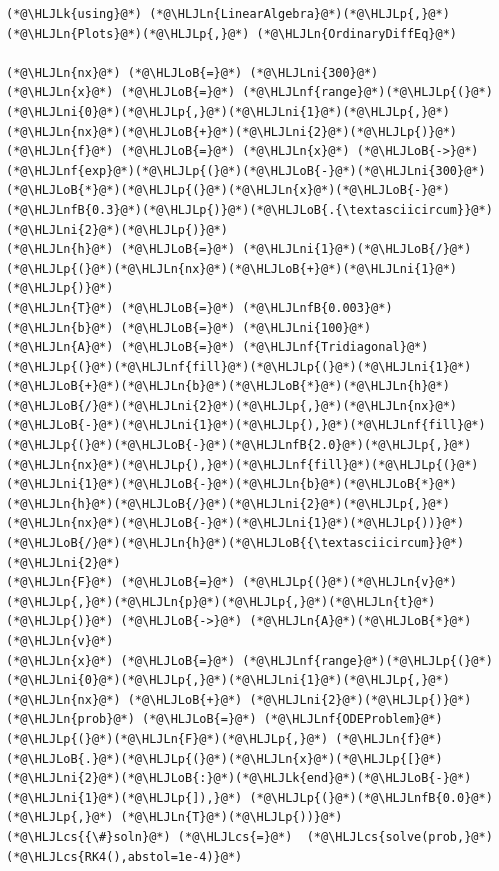 \documentclass[12pt,a4paper]{article}
\newcommand{\HLJLk}[1]{\textcolor[RGB]{148,91,176}{\textbf{#1}}}
\newcommand{\HLJLn}[1]{#1}
\newcommand{\HLJLnf}[1]{\textcolor[RGB]{66,102,213}{#1}}
\newcommand{\HLJLnfB}[1]{\textcolor[RGB]{59,151,46}{#1}}
\newcommand{\HLJLni}[1]{\textcolor[RGB]{59,151,46}{#1}}
\newcommand{\HLJLoB}[1]{\textcolor[RGB]{102,102,102}{\textbf{#1}}}
\newcommand{\HLJLp}[1]{#1}
\newcommand{\HLJLcs}[1]{\textcolor[RGB]{153,153,119}{\textit{#1}}}
\begin{document}
\begin{lstlisting}
(*@\HLJLk{using}@*) (*@\HLJLn{LinearAlgebra}@*)(*@\HLJLp{,}@*) (*@\HLJLn{Plots}@*)(*@\HLJLp{,}@*) (*@\HLJLn{OrdinaryDiffEq}@*)

(*@\HLJLn{nx}@*) (*@\HLJLoB{=}@*) (*@\HLJLni{300}@*)
(*@\HLJLn{x}@*) (*@\HLJLoB{=}@*) (*@\HLJLnf{range}@*)(*@\HLJLp{(}@*)(*@\HLJLni{0}@*)(*@\HLJLp{,}@*)(*@\HLJLni{1}@*)(*@\HLJLp{,}@*)(*@\HLJLn{nx}@*)(*@\HLJLoB{+}@*)(*@\HLJLni{2}@*)(*@\HLJLp{)}@*)
(*@\HLJLn{f}@*) (*@\HLJLoB{=}@*) (*@\HLJLn{x}@*) (*@\HLJLoB{->}@*) (*@\HLJLnf{exp}@*)(*@\HLJLp{(}@*)(*@\HLJLoB{-}@*)(*@\HLJLni{300}@*)(*@\HLJLoB{*}@*)(*@\HLJLp{(}@*)(*@\HLJLn{x}@*)(*@\HLJLoB{-}@*)(*@\HLJLnfB{0.3}@*)(*@\HLJLp{)}@*)(*@\HLJLoB{.{\textasciicircum}}@*)(*@\HLJLni{2}@*)(*@\HLJLp{)}@*)
(*@\HLJLn{h}@*) (*@\HLJLoB{=}@*) (*@\HLJLni{1}@*)(*@\HLJLoB{/}@*)(*@\HLJLp{(}@*)(*@\HLJLn{nx}@*)(*@\HLJLoB{+}@*)(*@\HLJLni{1}@*)(*@\HLJLp{)}@*)
(*@\HLJLn{T}@*) (*@\HLJLoB{=}@*) (*@\HLJLnfB{0.003}@*)
(*@\HLJLn{b}@*) (*@\HLJLoB{=}@*) (*@\HLJLni{100}@*)
(*@\HLJLn{A}@*) (*@\HLJLoB{=}@*) (*@\HLJLnf{Tridiagonal}@*)(*@\HLJLp{(}@*)(*@\HLJLnf{fill}@*)(*@\HLJLp{(}@*)(*@\HLJLni{1}@*)(*@\HLJLoB{+}@*)(*@\HLJLn{b}@*)(*@\HLJLoB{*}@*)(*@\HLJLn{h}@*)(*@\HLJLoB{/}@*)(*@\HLJLni{2}@*)(*@\HLJLp{,}@*)(*@\HLJLn{nx}@*)(*@\HLJLoB{-}@*)(*@\HLJLni{1}@*)(*@\HLJLp{),}@*)(*@\HLJLnf{fill}@*)(*@\HLJLp{(}@*)(*@\HLJLoB{-}@*)(*@\HLJLnfB{2.0}@*)(*@\HLJLp{,}@*)(*@\HLJLn{nx}@*)(*@\HLJLp{),}@*)(*@\HLJLnf{fill}@*)(*@\HLJLp{(}@*)(*@\HLJLni{1}@*)(*@\HLJLoB{-}@*)(*@\HLJLn{b}@*)(*@\HLJLoB{*}@*)(*@\HLJLn{h}@*)(*@\HLJLoB{/}@*)(*@\HLJLni{2}@*)(*@\HLJLp{,}@*)(*@\HLJLn{nx}@*)(*@\HLJLoB{-}@*)(*@\HLJLni{1}@*)(*@\HLJLp{))}@*)(*@\HLJLoB{/}@*)(*@\HLJLn{h}@*)(*@\HLJLoB{{\textasciicircum}}@*)(*@\HLJLni{2}@*)
(*@\HLJLn{F}@*) (*@\HLJLoB{=}@*) (*@\HLJLp{(}@*)(*@\HLJLn{v}@*)(*@\HLJLp{,}@*)(*@\HLJLn{p}@*)(*@\HLJLp{,}@*)(*@\HLJLn{t}@*)(*@\HLJLp{)}@*) (*@\HLJLoB{->}@*) (*@\HLJLn{A}@*)(*@\HLJLoB{*}@*)(*@\HLJLn{v}@*)
(*@\HLJLn{x}@*) (*@\HLJLoB{=}@*) (*@\HLJLnf{range}@*)(*@\HLJLp{(}@*)(*@\HLJLni{0}@*)(*@\HLJLp{,}@*)(*@\HLJLni{1}@*)(*@\HLJLp{,}@*)(*@\HLJLn{nx}@*) (*@\HLJLoB{+}@*) (*@\HLJLni{2}@*)(*@\HLJLp{)}@*)
(*@\HLJLn{prob}@*) (*@\HLJLoB{=}@*) (*@\HLJLnf{ODEProblem}@*)(*@\HLJLp{(}@*)(*@\HLJLn{F}@*)(*@\HLJLp{,}@*) (*@\HLJLn{f}@*)(*@\HLJLoB{.}@*)(*@\HLJLp{(}@*)(*@\HLJLn{x}@*)(*@\HLJLp{[}@*)(*@\HLJLni{2}@*)(*@\HLJLoB{:}@*)(*@\HLJLk{end}@*)(*@\HLJLoB{-}@*)(*@\HLJLni{1}@*)(*@\HLJLp{]),}@*) (*@\HLJLp{(}@*)(*@\HLJLnfB{0.0}@*)(*@\HLJLp{,}@*) (*@\HLJLn{T}@*)(*@\HLJLp{))}@*)
(*@\HLJLcs{{\#}soln}@*) (*@\HLJLcs{=}@*)  (*@\HLJLcs{solve(prob,}@*) (*@\HLJLcs{RK4(),abstol=1e-4)}@*)

\end{lstlisting}
\end{document}

